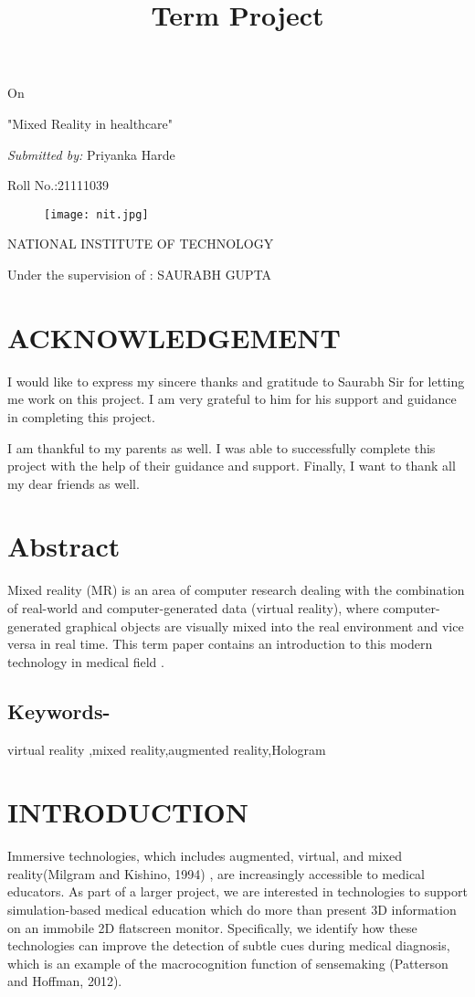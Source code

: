 \documentclass[11pt]{article}
\title{\Huge \textbf{Term Project}}
\begin{document}
\maketitle
\centering On

\Huge "Mixed Reality in healthcare"
\setlength{\parskip}{0.5em}

\emph{\large Submitted by:}
\large Priyanka Harde

\large Roll No.:21111039
\begin{figure}[h]
\begin{center}
\texttt{[image: nit.jpg]}
\end{center}
\end{figure}

\textsc{\Large NATIONAL INSTITUTE OF TECHNOLOGY}

\large Under the supervision of : SAURABH GUPTA 
\clearpage 
\tableofcontents
\clearpage
\section{ ACKNOWLEDGEMENT}
 \raggedright I would like to express my sincere thanks and gratitude to Saurabh Sir for letting me work on this project. I am very grateful to him for his support and guidance in completing this project.

I am thankful to my parents as well. I was able to successfully complete this project with the help of their guidance and support. Finally, I want to thank all my dear friends as well.
\section{Abstract}


Mixed reality (MR) is an area of computer research dealing with the combination of real-world and computer-generated data (virtual reality), where computer-generated graphical objects are visually mixed into the real environment and vice versa in real time. This term paper contains an introduction to this modern technology in medical field .
\subsection{Keywords-}
virtual reality ,mixed reality,augmented reality,Hologram

\section{\textbf{INTRODUCTION}}
Immersive technologies, which includes augmented, virtual, and mixed reality(Milgram and Kishino, 1994) , are increasingly accessible to medical educators. As part of a larger project, we are interested in technologies to support simulation-based medical education which do more than present 3D information on an immobile 2D flatscreen monitor. Specifically, we identify how these technologies can improve the detection of subtle cues during medical diagnosis, which is an example of the macrocognition function of sensemaking (Patterson and Hoffman, 2012).
\end{document}
